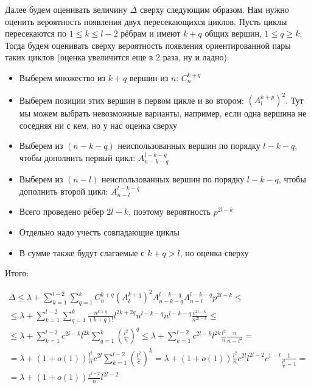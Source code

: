 \documentclass{article}
\theoremstyle{definition}
\theoremstyle{remark}
\renewcommand{\le}{\leqslant}
\renewcommand{\ge}{\geqslant}
\begin{document}
Далее будем оценивать величину $\overline{\Delta}$ сверху следующим образом. Нам нужно оценить
вероятность появления двух пересекающихся циклов. Пусть циклы пересекаются по $1 \le k \le l - 2$
рёбрам и имеют $k + q$ общих вершин, $1 \le q \ge k$.
Тогда будем оценивать сверху вероятность появления ориентированной пары таких циклов (оценка
увеличится еще в 2 раза, ну и ладно):
\begin{itemize}
	\item Выберем множество из $k + q$ вершин из $n$: $C_n^{k+q}$
	\item Выберем позиции этих вершин в первом цикле и во втором: $(A_l^{k+p})^2$. Тут мы можем
		выбрать невозможные варианты, например, если одна вершина не соседняя ни с кем, но у нас оценка
		сверху
	\item Выберем из $(n - k - q)$ неиспользованных вершин по порядку $l - k - q$, чтобы дополнить
		первый цикл: $A_{n - k - q}^{l - k - q}$
	\item Выберем из $(n - l)$ неиспользованных вершин по порядку $l - k - q$, чтобы дополнить
		второй цикл: $A_{n - l}^{l - k - q}$
	\item Всего проведено рёбер $2l - k$, поэтому вероятность $p^{2l - k}$
	\item Отдельно надо учесть совпадающие циклы
	\item В сумме также будут слагаемые с $k + q > l$, но оценка сверху
\end{itemize}

Итого:

\begin{multline*}
	\overline{\Delta} \le \lambda + \sum\limits_{k=1}^{l-2}\sum\limits_{q=1}^{k} C_n^{k+q}
	(A_l^{k+q})^2 A_{n - k - q}^{l - k - q} A_{n - l}^{l - k - q} p^{2l - k} \le\\\le \lambda +
	\sum\limits_{k=1}^{l-2}\sum\limits_{q=1}^{k} \frac{n^{k+q}}{(k+q)!} l^{2k+2q} n^{l-k-q} n^{l-k-q}
	\frac{c^{2l-k}}{n^{2l-k}} \le\\\le \lambda + \sum\limits_{k=1}^{l-2}
	c^{2l-k} l^{2k} \sum\limits_{q=1}^{k} \left(\frac{l^2}{n}\right)^q \le
	\lambda + \sum\limits_{k=1}^{l-2} c^{2l-k} l^{2k} \frac{l^2}{n} \frac{n}{n - l^2} =\\=
	\lambda + (1 + o(1)) \frac{l^2}{n} c^{2l} \sum\limits_{k=1}^{l-2} \left(\frac{l^2}{c}\right)^k
	= \lambda + (1 + o(1)) \frac{l^2}{n} c^{2l} l^{2l-2} c^{1-l} \frac{1}{\frac{l^2}{c} - 1} =\\=
	\lambda +  (1 + o(1)) \frac{c^{l+2}}{n} l^{2l-2} 
\end{multline*}
\end{document}
